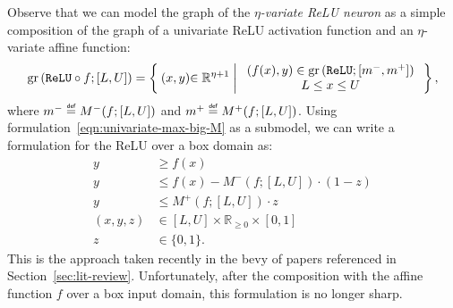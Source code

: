 \documentclass[smallextended]{svjour3}
\newcommand{\blue}[1]{{#1}}
\newcommand{\bbR}{\mathbb{R}}
\newcommand{\gr}{\operatorname{gr}}
\newcommand\defeq{\mathrel{\overset{\makebox[0pt]{\mbox{\normalfont\tiny\sffamily def}}}{=}}}
\newcommand{\ReLu}{\texttt{ReLU}}
\begin{document}
Observe that we can model the \blue{graph} of the  \emph{\blue{$\eta$-variate} ReLU \blue{neuron}} as a simple composition of \blue{the graph of} a univariate ReLU \blue{activation function} and an \blue{$\eta$-variate} affine function:
\begin{equation}
  \blue{\gr\left(\ReLu{} \circ f;[L,U]\right)} =  \Set{ (x,y)\blue{\in\bbR^{\eta+1}} | \begin{array}{c}
        (f(x),y) \in \gr\left(\ReLu{}; [\blue{m^-,m^+}]\right) \\
        L \leq x \leq U
    \end{array}
    },
\end{equation}
\blue{where $m^-\defeq M^-(f; [L,U])$ and $m^+\defeq M^+(f; [L,U])$}.
Using formulation~\eqref{eqn:univariate-max-big-M} as a submodel, we can write a formulation for the ReLU over a box domain as:
\begin{subequations} \label{eqn:relu-big-M}
\begin{align}
    y &\geq f(x) \\
    y &\leq f(x) - M^-(f;[L,U]) \cdot (1-z) \label{eqn:relu-big-M-2} \\
    y &\leq M^+(f;[L,U]) \cdot z \label{eqn:relu-big-M-3} \\
    (x,y,z) &\in [L,U] \times \bbR_{\geq 0} \times [0,1] \\
    z &\in \{0,1\}.
\end{align}
\end{subequations}
This is the approach taken recently in the bevy of papers referenced in Section~\ref{sec:lit-review}. Unfortunately, after the composition with the affine function $f$ over a box input domain, this formulation is no longer sharp.
\end{document}
